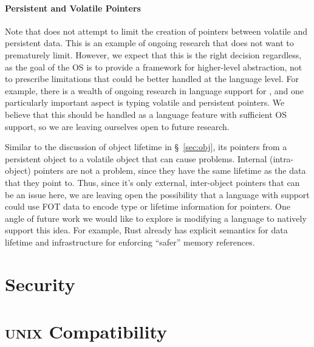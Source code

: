 {        \paragraph{Persistent and Volatile Pointers}

        Note that \Twizzler does not attempt to limit the creation of pointers between volatile and
        persistent data. This is an example of ongoing \NVM research that \Twizzler does not want to
        prematurely limit. However, we expect that this is the right decision regardless, as the goal of the
        OS is to provide a framework for higher-level abstraction, not to prescribe limitations that could
        be better handled at the language level. For example, there is a wealth of ongoing research in
        language support for \NVM {}, and one particularly important aspect is typing volatile and
        persistent pointers. We believe that this should be handled as a language feature with sufficient OS
        support, so we are leaving ourselves open to future research.

        Similar to the discussion of object lifetime in \S~\ref{sec:obj}, its pointers from a persistent
        object to a volatile object that can cause problems. Internal (intra-object) pointers are not a
        problem, since they have the same lifetime as the data that they point to. Thus, since it's only
        external, inter-object pointers that can be an issue here, we are leaving open the possibility that
        a language with \Twizzler support could use FOT data to encode type or lifetime information for
        pointers. One angle of future work we would like to explore is modifying a language to natively
        support this idea. For example, Rust already has explicit semantics for data lifetime and
        infrastructure for enforcing ``safer'' memory references.
    \fi
}
\section{Security}

\section{\textsc{unix} Compatibility}

